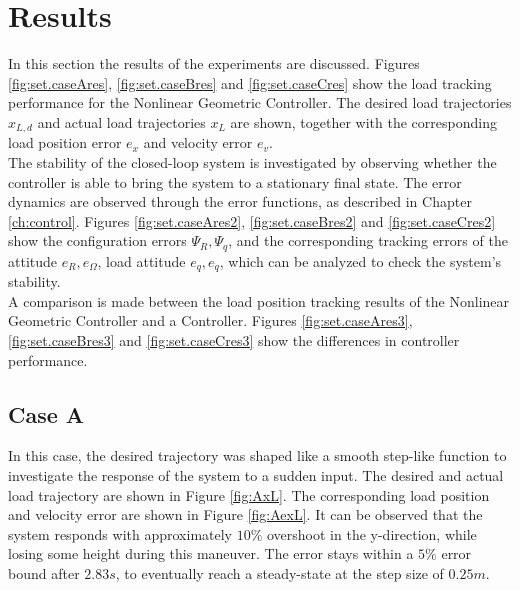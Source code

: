\newpage
\section{Results}\label{sec:exp.results}
In this section the results of the experiments are discussed. Figures \ref{fig:set.caseAres}, \ref{fig:set.caseBres} and \ref{fig:set.caseCres} show the load tracking performance for the Nonlinear Geometric Controller. 
The desired load trajectories $ x_{L,d} $ and actual load trajectories $ x_L $ are shown, together with the corresponding load position error $ e_x $ and velocity error $ e_v $.\\ 
The stability of the closed-loop system is investigated by observing whether the controller is able to bring the system to a stationary final state.
The error dynamics are observed through the error functions, as described in Chapter \ref{ch:control}.
Figures \ref{fig:set.caseAres2}, \ref{fig:set.caseBres2} and \ref{fig:set.caseCres2} show the configuration errors $ \Psi_R, \Psi_q $, and the corresponding tracking errors of the  attitude $ e_R, e_\Omega $, load attitude $ e_q, e_{\dot{q}} $, which can be analyzed to check the system's stability.\\
A comparison is made between the load position tracking results of the Nonlinear Geometric Controller and a  Controller.
Figures \ref{fig:set.caseAres3}, \ref{fig:set.caseBres3} and \ref{fig:set.caseCres3} show the differences in controller performance.


\subsection*{Case A}
In this case, the desired trajectory was shaped like a smooth step-like function to investigate the response of the system to a sudden input.
The desired and actual load trajectory are shown in Figure \ref{fig:AxL}.
The corresponding load position and velocity error are shown in Figure \ref{fig:AexL}.
It can be observed that the system responds with approximately $ 10 \% $ overshoot in the y-direction, while losing some height during this maneuver. 
The error stays within a $ 5 \% $ error bound after 
$ 2.83 s $, 
to eventually reach a steady-state at the step size of $ 0.25 m $.

